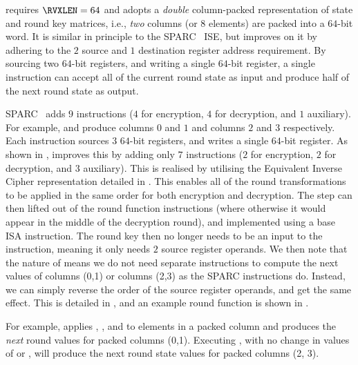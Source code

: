 
 requires $\RVXLEN = 64$
and adopts a {\em double} column-packed 
representation of state and round key matrices,
i.e., {\em two} columns (or $8$ elements) are packed into a $64$-bit word.
It is similar in principle to the SPARC~\cite[Page 109]{SPARC:16} ISE,
but improves on it by adhering to the
$2$ source and $1$ destination register address requirement.
By sourcing two $64$-bit registers, and writing a single $64$-bit register,
a single instruction can 
accept  all  of the current round state as  input
and
produce half of the next    round state as output.

SPARC~\cite[Page 109]{SPARC:16} adds $ 9$
instructions ($4$ for encryption, $4$ for decryption, and $1$ auxiliary).
For example,  and 
produce columns $0$ and $1$ and columns $2$ and $3$
respectively.
Each instruction sources $3$ $64$-bit registers, and writes a single
$64$-bit register.
As shown in ,  improves this by 
adding only $ 7$
instructions ($2$ for encryption, $2$ for decryption, and $3$ auxiliary).
This is realised by utilising the Equivalent Inverse Cipher representation
detailed in \cite[Section 5.3.5]{FIPS:197}.
This enables all of the round transformations to be applied in the same
order for both encryption and decryption.
The  step can then lifted out of the
round function instructions (where otherwise it would appear in the middle of
the decryption round), and implemented using a base ISA 
instruction.
The round key then no longer needs to be an input to the instruction,
meaning it only needs $2$ source register operands.
We then note that the nature of  means we do
not need separate instructions to compute the next values of
columns (0,1) or columns (2,3) as the SPARC instructions do.
Instead, we can simply reverse the order of the source register
operands, and get the same effect.
This is detailed in , and an example round
function is shown in .

For example,
applies
, , and   
to elements in a packed column and
produces the {\em next} round values for packed columns (0,1).
Executing
, with no change in values of
 or , will produce the next round state values for
packed columns (2, 3).

